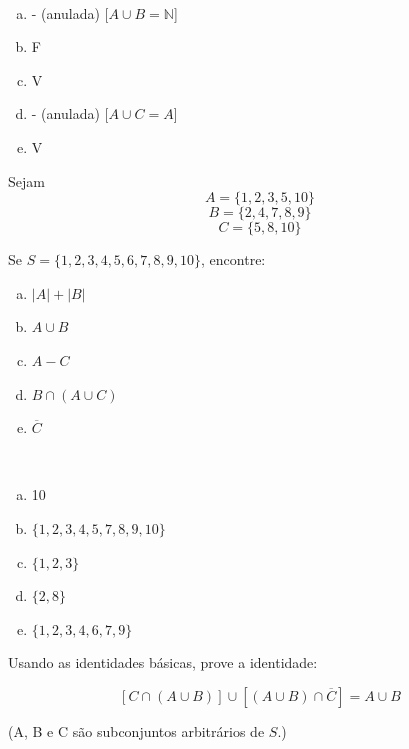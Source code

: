 \documentclass[a4paper, 12pt, addpoints]{exam}
\begin{document}
\begin{questions}
\begin{resp}~
    
    \begin{multicols}{2}
    \begin{enumerate}[a)]
        \item - (anulada) [$A \cup B = \mathbb{N}$]
        \item F
        \item V
        \item - (anulada) [$A \cup C = A$]
        \item V
    \end{enumerate}
\end{multicols}
\end{resp}

\question Sejam
\[ A = \{1,2,3,5,10\} \]
\[ B = \{2,4,7,8,9\} \]
\[ C = \{5,8,10\} \]

Se $S=\{1,2,3,4,5,6,7,8,9,10\}$, encontre:

\begin{enumerate}[a)]   
    \item $|A| + |B|$
    \item $A \cup B$
    \item $A - C$
    \item $B \cap (A \cup C)$
    \item $\overline{C}$
\end{enumerate}

\begin{resp}~
    
    \begin{multicols}{2}
    \begin{enumerate}[a)]   
        \item 10
        \item $\{1,2,3,4,5,7,8,9,10\}$
        \item $\{ 1,2,3 \}$
        \item $\{ 2,8 \}$
        \item $\{ 1,2,3,4,6,7,9 \}$
    \end{enumerate}
\end{multicols}
\end{resp}

\question Usando as identidades básicas, prove a identidade:

\[
[C \cap (A \cup B)] \cup \left[(A \cup B) \cap \overline{C}\right] = A \cup B
\]

\begin{center}
    (A, B e C são subconjuntos arbitrários de $S$.)
\end{center}


\end{questions}
\end{document}
